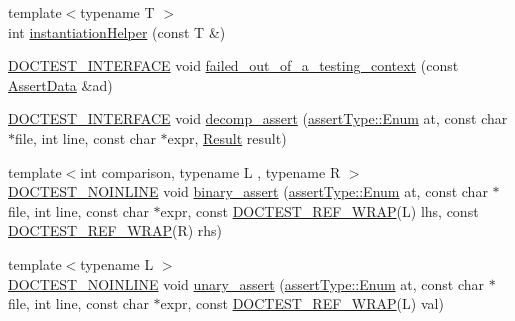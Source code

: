 \begin{DoxyCompactItemize}
\item 
{\footnotesize template$<$typename T $>$ }\\int \mbox{\hyperlink{namespacedoctest_1_1detail_aad401b097a9af4df1d4a9d0911957c0f}{instantiation\+Helper}} (const T \&)
\item 
\mbox{\hyperlink{doctest_8h_a9c16ffc635ec47f07797d21ede26b1a5}{D\+O\+C\+T\+E\+S\+T\+\_\+\+I\+N\+T\+E\+R\+F\+A\+CE}} void \mbox{\hyperlink{namespacedoctest_1_1detail_a0ff832be68bf666d856aefd539e1ce81}{failed\+\_\+out\+\_\+of\+\_\+a\+\_\+testing\+\_\+context}} (const \mbox{\hyperlink{structdoctest_1_1_assert_data}{Assert\+Data}} \&ad)
\item 
\mbox{\hyperlink{doctest_8h_a9c16ffc635ec47f07797d21ede26b1a5}{D\+O\+C\+T\+E\+S\+T\+\_\+\+I\+N\+T\+E\+R\+F\+A\+CE}} void \mbox{\hyperlink{namespacedoctest_1_1detail_a6d4efb043e9e5a6fa0db64f0e230a7a7}{decomp\+\_\+assert}} (\mbox{\hyperlink{namespacedoctest_1_1assert_type_ae1bb5bed722f34f1c38b83cb19d326d3}{assert\+Type\+::\+Enum}} at, const char $\ast$file, int line, const char $\ast$expr, \mbox{\hyperlink{structdoctest_1_1detail_1_1_result}{Result}} result)
\item 
{\footnotesize template$<$int comparison, typename L , typename R $>$ }\\\mbox{\hyperlink{doctest_8h_a47e9d3609dfcc90b9a630ff33b9524d6}{D\+O\+C\+T\+E\+S\+T\+\_\+\+N\+O\+I\+N\+L\+I\+NE}} void \mbox{\hyperlink{namespacedoctest_1_1detail_a570279a22ca888528e87a426853a0288}{binary\+\_\+assert}} (\mbox{\hyperlink{namespacedoctest_1_1assert_type_ae1bb5bed722f34f1c38b83cb19d326d3}{assert\+Type\+::\+Enum}} at, const char $\ast$file, int line, const char $\ast$expr, const \mbox{\hyperlink{doctest_8h_af2901cafb023c57fb672ccb1bf14f2eb}{D\+O\+C\+T\+E\+S\+T\+\_\+\+R\+E\+F\+\_\+\+W\+R\+AP}}(L) lhs, const \mbox{\hyperlink{doctest_8h_af2901cafb023c57fb672ccb1bf14f2eb}{D\+O\+C\+T\+E\+S\+T\+\_\+\+R\+E\+F\+\_\+\+W\+R\+AP}}(R) rhs)
\item 
{\footnotesize template$<$typename L $>$ }\\\mbox{\hyperlink{doctest_8h_a47e9d3609dfcc90b9a630ff33b9524d6}{D\+O\+C\+T\+E\+S\+T\+\_\+\+N\+O\+I\+N\+L\+I\+NE}} void \mbox{\hyperlink{namespacedoctest_1_1detail_a5343d1b26df7f86767d5e7026c03bf0f}{unary\+\_\+assert}} (\mbox{\hyperlink{namespacedoctest_1_1assert_type_ae1bb5bed722f34f1c38b83cb19d326d3}{assert\+Type\+::\+Enum}} at, const char $\ast$file, int line, const char $\ast$expr, const \mbox{\hyperlink{doctest_8h_af2901cafb023c57fb672ccb1bf14f2eb}{D\+O\+C\+T\+E\+S\+T\+\_\+\+R\+E\+F\+\_\+\+W\+R\+AP}}(L) val)
\item 

\end{DoxyCompactItemize}
